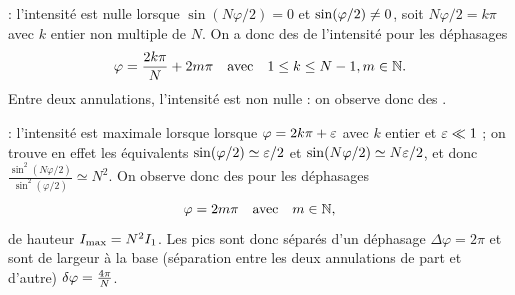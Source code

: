 \documentclass[12pt,fancy]{cours}
\begin{document}
 \begin{liste}
  \item {} : l'intensité est nulle lorsque $\sin(N\varphi/2)=0$ et $\sin(\varphi/2)\neq 0$, soit $N\varphi/2 = k\pi$ avec $k$ entier non multiple de $N$. On a donc des  de l'intensité pour les déphasages 
  \begin{equation}
    \varphi = \frac{2k\pi}{N} + 2 m \pi \quad \text{avec} \quad 1\leq k\leq N-1, m \in \mathbb{N}.
  \end{equation}
  Entre deux annulations, l'intensité est non nulle : on observe donc des .
  \item {} : l'intensité est maximale lorsque lorsque $\varphi = 2k\pi + \varepsilon$ avec $k$ entier et $\varepsilon \ll 1$ ; on trouve en effet les équivalents $\sin(\varphi/2) \simeq \varepsilon/2$ et $\sin(N\varphi/2) \simeq N\varepsilon/2$, et donc 
  $
  \frac{\sin^{2}(N\varphi/2)}{\sin^{2}(\varphi/2)} \simeq  N^2.
  $
  On observe donc des  pour les déphasages 
  \begin{equation}
    \varphi = 2m\pi \quad \text{avec} \quad m \in \mathbb{N},
  \end{equation}
  de hauteur $I_{\rm max} = N^2I_1$.  Les pics sont donc séparés d’un déphasage $\Delta\varphi = 2\pi$ et sont de largeur à la base (séparation entre les deux annulations de part et d’autre) $\delta \varphi = \frac{4\pi}{N}$.
 \end{liste}
 
\end{document}
